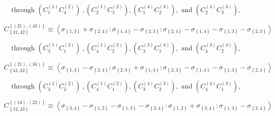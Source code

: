 \documentclass[11pt]{article}
\begin{document}
\begin{equation*}
\text{through }\left( C_{1}^{\left( 1\right) }C_{4}^{\left( 2\right)
}\right) \ ,\left( C_{2}^{\left( 1\right) }C_{3}^{\left( 2\right) }\right)
,\left( C_{1}^{\left( 4\right) }C_{2}^{\left( 3\right) }\right) ,\text{ and }%
\left( C_{2}^{\left( 4\right) }C_{3}^{\left( 3\right) }\right) ,
\end{equation*}

\begin{equation*}
C_{\left\{ 31,42\right\} }^{\left\{ \left( 21\right) ,\left( 43\right)
\right\} }\equiv \left\langle \sigma _{\left\{ 1,3\right\} }+\sigma
_{\left\{ 2,4\right\} }:\sigma _{\left\{ 1,4\right\} }-\sigma _{\left\{
2,3\right\} }:\sigma _{\left\{ 2,4\right\} }-\sigma _{\left\{ 1,4\right\}
}-\sigma _{\left\{ 1,3\right\} }-\sigma _{\left\{ 2,3\right\} }\right\rangle 
\end{equation*}

\begin{equation*}
\text{through }\left( C_{3}^{\left( 1\right) }C_{1}^{\left( 2\right)
}\right) \ ,\left( C_{4}^{\left( 1\right) }C_{2}^{\left( 2\right) }\right)
,\left( C_{3}^{\left( 3\right) }C_{1}^{\left( 4\right) }\right) ,\text{ and }%
\left( C_{4}^{\left( 3\right) }C_{2}^{\left( 4\right) }\right) ,
\end{equation*}

\begin{equation*}
C_{\left\{ 41,32\right\} }^{\left\{ \left( 21\right) ,\left( 34\right)
\right\} }\equiv \left\langle \sigma _{\left\{ 1,3\right\} }-\sigma
_{\left\{ 2,4\right\} }:\sigma _{\left\{ 2,3\right\} }+\sigma _{\left\{
1,4\right\} }:\sigma _{\left\{ 2,3\right\} }-\sigma _{\left\{ 1,4\right\}
}-\sigma _{\left\{ 1,3\right\} }-\sigma _{\left\{ 2,4\right\} }\right\rangle 
\end{equation*}

\begin{equation*}
\text{through }\left( C_{3}^{\left( 1\right) }C_{2}^{\left( 2\right)
}\right) \ ,\left( C_{4}^{\left( 1\right) }C_{1}^{\left( 2\right) }\right)
,\left( C_{3}^{\left( 4\right) }C_{2}^{\left( 3\right) }\right) ,\text{ and }%
\left( C_{4}^{\left( 4\right) }C_{1}^{\left( 3\right) }\right) ,
\end{equation*}

\begin{equation*}
C_{\left\{ 12,43\right\} }^{\left\{ \left( 14\right) ,\left( 23\right)
\right\} }\equiv \left\langle \sigma _{\left\{ 3,4\right\} }-\sigma
_{\left\{ 1,2\right\} }-\sigma _{\left\{ 1,3\right\} }-\sigma _{\left\{
2,4\right\} }:\sigma _{\left\{ 1,2\right\} }+\sigma _{\left\{ 3,4\right\}
}:\sigma _{\left\{ 1,3\right\} }-\sigma _{\left\{ 2,4\right\} }\right\rangle 
\end{equation*}
\end{document}
